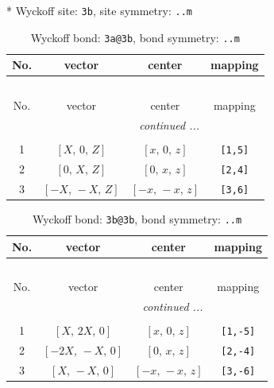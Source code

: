 \documentclass[fleqn,8pt]{jsarticle}
\begin{document}
* Wyckoff site: {\tt 3b}, site symmetry: {\tt ..m}
\renewcommand{\arraystretch}{1.2}
\begin{longtable}{cccc}
\caption{Wyckoff bond: {\tt 3a@3b}, bond symmetry: {\tt ..m}}
 \\
 \hline \hline
No. & vector & center & mapping \\ \hline \endfirsthead

\multicolumn{3}{l}{\tablename\ \thetable{}} \\
 \hline \hline
No. & vector & center & mapping \\ \hline \endhead

 \hline \hline
\multicolumn{3}{r}{\footnotesize\it continued ...} \\ \endfoot

 \hline \hline
\multicolumn{3}{r}{} \\ \endlastfoot

1 & $\left[ X,\, 0,\, Z \right]$ & $\left[ x,\, 0,\, z \right]$ & {\tt [1,5]} \\ \hline
2 & $\left[ 0,\, X,\, Z \right]$ & $\left[ 0,\, x,\, z \right]$ & {\tt [2,4]} \\ \hline
3 & $\left[ - X,\, - X,\, Z \right]$ & $\left[ - x,\, - x,\, z \right]$ & {\tt [3,6]} \\
\end{longtable}
\renewcommand{\arraystretch}{1.2}
\begin{longtable}{cccc}
\caption{Wyckoff bond: {\tt 3b@3b}, bond symmetry: {\tt ..m}}
 \\
 \hline \hline
No. & vector & center & mapping \\ \hline \endfirsthead

\multicolumn{3}{l}{\tablename\ \thetable{}} \\
 \hline \hline
No. & vector & center & mapping \\ \hline \endhead

 \hline \hline
\multicolumn{3}{r}{\footnotesize\it continued ...} \\ \endfoot

 \hline \hline
\multicolumn{3}{r}{} \\ \endlastfoot

1 & $\left[ X,\, 2 X,\, 0 \right]$ & $\left[ x,\, 0,\, z \right]$ & {\tt [1,-5]} \\ \hline
2 & $\left[ - 2 X,\, - X,\, 0 \right]$ & $\left[ 0,\, x,\, z \right]$ & {\tt [2,-4]} \\ \hline
3 & $\left[ X,\, - X,\, 0 \right]$ & $\left[ - x,\, - x,\, z \right]$ & {\tt [3,-6]} \\
\end{longtable}
\end{document}

